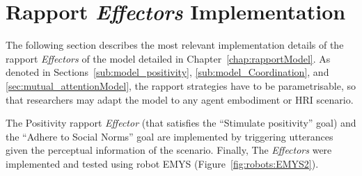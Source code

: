 \section{Rapport \textit{Effectors} Implementation}
\label{sec:rapportStrategies}

The following section describes the most relevant implementation details of the rapport \textit{Effectors} of the model detailed in Chapter~\ref{chap:rapportModel}. As denoted in Sections~\ref{sub:model_positivity}, \ref{sub:model_Coordination}, and \ref{sec:mutual_attentionModel}, the rapport strategies have to be parametrisable, so that researchers may adapt the model to any agent embodiment or \ac{HRI} scenario. 

The Positivity rapport \textit{Effector} (that satisfies the ``Stimulate positivity'' goal) and the ``Adhere to Social Norms'' goal are implemented by triggering utterances given the perceptual information of the scenario. Finally, The \textit{Effectors} were implemented and tested using robot \ac{EMYS} (Figure~\ref{fig:robots:EMYS2}).
















